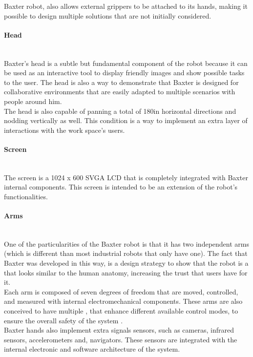 \documentclass[11pt]{report} %
\newcommand{\subsubsubsection}[1]{\paragraph{#1}\mbox{}\\}
\begin{document}
Baxter robot, also allows external  grippers to be attached to its hands, making it possible to design multiple solutions that are not initially considered.\\

\subsubsubsection{Head}

Baxter's head is a subtle but fundamental component of the robot because it can be used as an interactive tool to display friendly images and show possible tasks to the user. The head is also a way to demonstrate that Baxter is designed for collaborative environments that are easily adapted to multiple scenarios with people around him.\\ 

The head is also capable of panning a total of 180\textdegree \space in horizontal directions and nodding vertically as well. This condition is a way to implement an extra layer of interactions with the work space's users.\\

\subsubsubsection{Screen}

The screen is a 1024 x 600 SVGA LCD that is completely integrated with Baxter internal components. This screen is intended to be an extension of the robot's functionalities.\\

\subsubsubsection{Arms}

One of the particularities of the Baxter robot is that it has two independent arms (which is different than most industrial robots that only have one). The fact that Baxter was developed in this way, is a design strategy to show that the robot is a  that looks similar to the human anatomy, increasing the trust that users have for it.\\

Each arm is composed of seven degrees of freedom that are moved, controlled, and measured with internal electromechanical components. These arms are also conceived to have multiple , that enhance different available control modes, to ensure the overall safety of the system \citep{cite_baxter_arms_wiki}.\\

Baxter hands also implement extra signals sensors, such as cameras, infrared sensors, accelerometers and, navigators. These sensors are integrated with the internal electronic and software architecture of the system.\\
\end{document}
